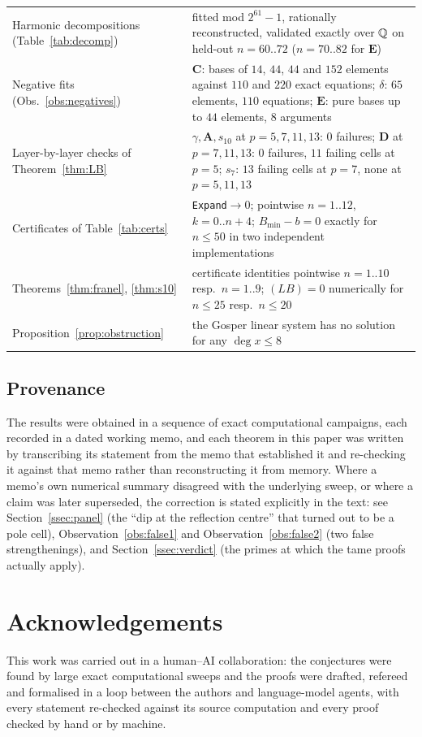 \begin{center}
\begin{tabular}{@{}>{\raggedright\arraybackslash}p{6.7cm}>{\raggedright\arraybackslash}p{6.3cm}@{}}
Harmonic decompositions (Table~\ref{tab:decomp}) & fitted mod $2^{61}-1$, rationally reconstructed, validated exactly over $\mathbb{Q}$ on held-out $n=60..72$ ($n=70..82$ for $\mathbf E$)\\
Negative fits (Obs.~\ref{obs:negatives}) & $\mathbf C$: bases of $14$, $44$, $44$ and $152$ elements against $110$ and $220$ exact equations; $\delta$: $65$ elements, $110$ equations; $\mathbf E$: pure bases up to $44$ elements, $8$ arguments\\
Layer-by-layer checks of Theorem~\ref{thm:LB} & $\gamma,\mathbf A,s_{10}$ at $p=5,7,11,13$: $0$ failures; $\mathbf D$ at $p=7,11,13$: $0$ failures, $11$ failing cells at $p=5$; $s_7$: $13$ failing cells at $p=7$, none at $p=5,11,13$\\
Certificates of Table~\ref{tab:certs} & \texttt{Expand}$\to0$; pointwise $n=1..12$, $k=0..n+4$; $B_{\min}-b=0$ exactly for $n\le50$ in two independent implementations\\
Theorems~\ref{thm:franel}, \ref{thm:s10} & certificate identities pointwise $n=1..10$ resp.\ $n=1..9$; $(LB)=0$ numerically for $n\le25$ resp.\ $n\le20$\\
Proposition~\ref{prop:obstruction} & the Gosper linear system has no solution for any $\deg x\le8$\\
\bottomrule
\end{tabular}
\end{center}

\subsection{Provenance}

The results were obtained in a sequence of exact computational campaigns, each recorded in
a dated working memo, and each theorem in this paper was written by transcribing its
statement from the memo that established it and re-checking it against that memo rather
than reconstructing it from memory. Where a memo's own numerical summary disagreed with
the underlying sweep, or where a claim was later superseded, the correction is stated
explicitly in the text: see Section~\ref{ssec:panel} (the ``dip at the reflection centre''
that turned out to be a pole cell), Observation~\ref{obs:false1} and
Observation~\ref{obs:false2} (two false strengthenings), and Section~\ref{ssec:verdict}
(the primes at which the tame proofs actually apply).

\section*{Acknowledgements}

This work was carried out in a human--AI collaboration: the conjectures were found by
large exact computational sweeps and the proofs were drafted, refereed and formalised in a
loop between the authors and language-model agents, with every statement re-checked
against its source computation and every proof checked by hand or by machine.
